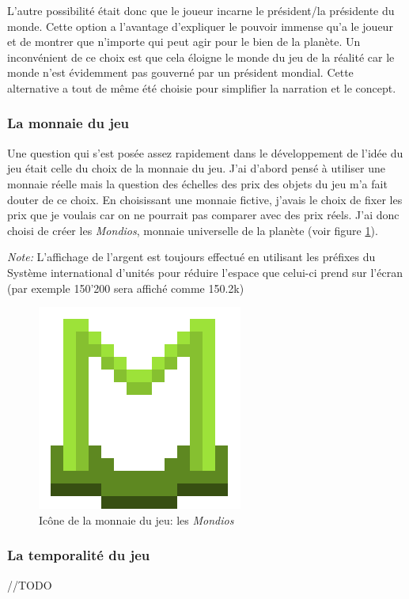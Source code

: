 \documentclass{article}
\begin{document}
        
        L'autre possibilité était donc que le joueur incarne le président/la présidente du monde. Cette option a l'avantage d'expliquer le pouvoir immense qu'a le joueur et de montrer que n'importe qui peut agir pour le bien de la planète.
        Un inconvénient de ce choix est que cela éloigne le monde du jeu de la réalité car le monde n'est évidemment pas gouverné par un président mondial. Cette alternative a tout de même été choisie pour simplifier la narration et le concept.
        

		\subsubsection{La monnaie du jeu}
		Une question qui s'est posée assez rapidement dans le développement de l'idée du jeu était celle du choix de la monnaie du jeu. J'ai d'abord pensé à utiliser une monnaie réelle mais la question des échelles des prix des objets du jeu m'a fait douter de ce choix. En choisissant une monnaie fictive, j'avais le choix de fixer les prix que je voulais car on ne pourrait pas comparer avec des prix réels.
		J'ai donc choisi de créer les \textit{Mondios}, monnaie universelle de la planète (voir figure \ref{fig:mondiosLogo}).
		
		
		\textit{Note: }L'affichage de l'argent est toujours effectué en utilisant les préfixes du Système international d'unités pour réduire l'espace que celui-ci prend sur l'écran (par exemple 150'200 sera affiché comme 150.2k)
		\begin{figure}[H]
                \centerline{\includegraphics[scale=.5]{../images/mondiosLogo}}
                \caption{Icône de la monnaie du jeu: les \textit{Mondios}}
                \label{fig:mondiosLogo}
        \end{figure}
        
        
        \subsubsection{La temporalité du jeu}
        //TODO
		
\end{document}
